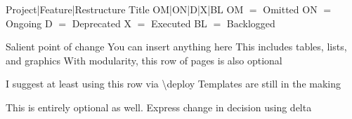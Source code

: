 \documentclass{article}
\begin{document}
\frontmatter
{Project|Feature|Restructure} 
{Title}
{OM|ON|D|X|BL}
{\hfill OM $=$ Omitted \hfill ON $=$ Ongoing \hfill D $=$ Deprecated \hfill X $=$ Executed \hfill BL $=$ Backlogged}

\strategy
{Salient point of change}
{You can insert anything here}
{This includes tables, lists, and graphics}
{With modularity, this row of pages is also optional}

\deploy
{I suggest at least using this row via {\textbackslash}deploy}
{Templates are still in the making}

\report
{This is entirely optional as well. Express change in decision using {\Delta}delta}
\end{document}
